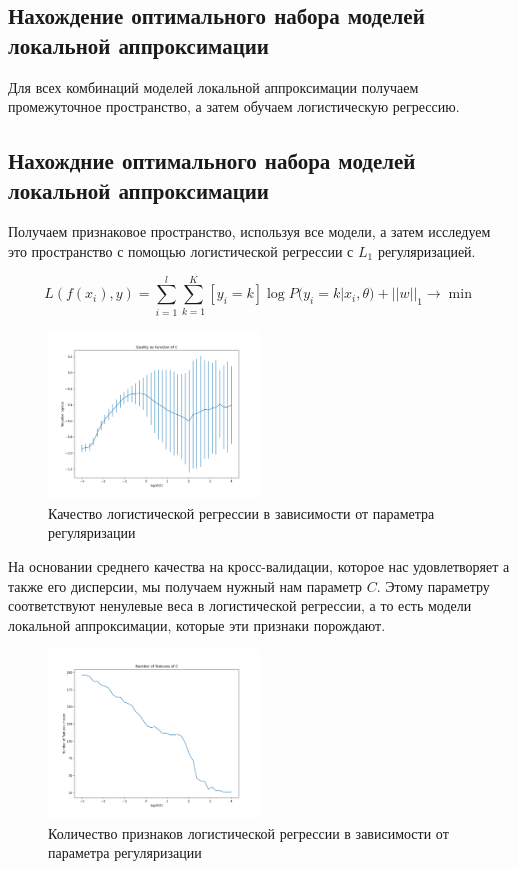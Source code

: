 \documentclass[12pt, fleqn, unicode]{article}
\begin{document}
\subsection{Нахождение оптимального набора моделей локальной аппроксимации}

Для всех комбинаций моделей локальной аппроксимации получаем промежуточное
пространство, а затем обучаем логистическую регрессию.

\subsection{Нахождние оптимального набора моделей локальной аппроксимации}

Получаем признаковое пространство, используя все модели, а затем исследуем
это пространство с помощью логистической регрессии с $L_1$ регуляризацией.

\begin{equation} \label{init-logloss}
    L(f(x_i), y) = \sum_{i=1}^l\sum_{k=1}^K [y_i = k]\log P(y_i = k| x_i, \theta) + ||w||_1 \to \min
\end{equation}


\begin{figure}[ht]
    \caption{Качество логистической регрессии в зависимости от параметра регуляризации}
    \centering
      \includegraphics[width=0.5\textwidth]{../pics/lr_quality_C.png}
\end{figure}

На основании среднего качества на кросс-валидации, которое нас удовлетворяет
а также его дисперсии, мы получаем нужный нам параметр $C$. Этому
параметру соответствуют ненулевые веса в логистической регрессии, а то есть
модели локальной аппроксимации, которые эти признаки порождают.

\begin{figure}[ht]
    \caption{Количество признаков логистической регрессии в зависимости от параметра регуляризации}
    \centering
      \includegraphics[width=0.5\textwidth]{../pics/lr_n_features_C.png}
\end{figure}
\end{document}
